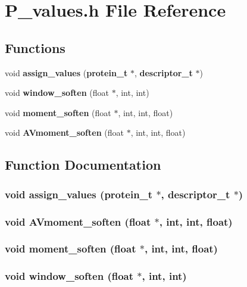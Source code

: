 \section{P\_\-values.h File Reference}
\label{P__values_8h}
\subsection*{Functions}
\begin{CompactItemize}
\item 
void {\bf assign\_\-values} ({\bf protein\_\-t} $\ast$, {\bf descriptor\_\-t} $\ast$)
\item 
void {\bf window\_\-soften} (float $\ast$, int, int)
\item 
void {\bf moment\_\-soften} (float $\ast$, int, int, float)
\item 
void {\bf AVmoment\_\-soften} (float $\ast$, int, int, float)
\end{CompactItemize}


\subsection{Function Documentation}
\subsubsection{\setlength{\rightskip}{0pt plus 5cm}void assign\_\-values ({\bf protein\_\-t} $\ast$, {\bf descriptor\_\-t} $\ast$)}\label{P__values_8h_a0}


\subsubsection{\setlength{\rightskip}{0pt plus 5cm}void AVmoment\_\-soften (float $\ast$, int, int, float)}\label{P__values_8h_a3}


\subsubsection{\setlength{\rightskip}{0pt plus 5cm}void moment\_\-soften (float $\ast$, int, int, float)}\label{P__values_8h_a2}


\subsubsection{\setlength{\rightskip}{0pt plus 5cm}void window\_\-soften (float $\ast$, int, int)}\label{P__values_8h_a1}


